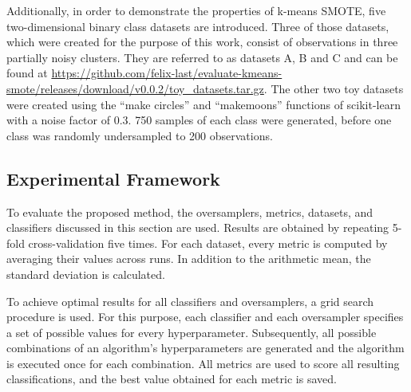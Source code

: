 \documentclass[sort&compress]{elsarticle}
\begin{document}
	Additionally, in order to demonstrate the properties of k-means \ac{SMOTE},
	five two-dimensional binary class datasets are introduced. Three of those
	datasets, which were created for the purpose of this work, consist of
	observations in three partially noisy clusters. They are referred to as
	datasets A, B and C and can be found at
	\url{https://github.com/felix-last/evaluate-kmeans-smote/releases/download/v0.0.2/toy_datasets.tar.gz}.
	The other two toy datasets were created using the ``make\textunderscore
	circles'' and ``make\textunderscore moons'' functions of scikit-learn with a
	noise factor of $0.3$. 750 samples of each class were generated, before one
	class was randomly undersampled to 200 observations.

	\subsection{Experimental Framework}
	\label{sec:experimental-framework}
	To evaluate the proposed method, the oversamplers, metrics, datasets, and
	classifiers discussed in this section are used. Results are obtained by
	repeating 5-fold cross-validation five times. For each dataset, every metric
	is computed by averaging their values across runs. In addition to the
	arithmetic mean, the standard deviation is calculated.

	To achieve optimal results for all classifiers and oversamplers, a grid
	search procedure is used. For this purpose, each classifier and each
	oversampler specifies a set of possible values for every hyperparameter.
	Subsequently, all possible combinations of an algorithm's hyperparameters
	are generated and the algorithm is executed once for each combination. All
	metrics are used to score all resulting classifications, and the best value
	obtained for each metric is saved.
\end{document}
